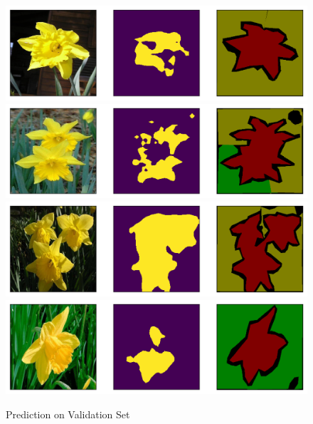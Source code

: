 \documentclass[12pt]{article}
\begin{document}
	\begin{figure}[H]
		\centering
		\caption{Prediction on Validation Set}
		\includegraphics[width=\linewidth]{figures/val0.png}
		\includegraphics[width=\linewidth]{figures/val1.png}
		\includegraphics[width=\linewidth]{figures/val2.png}
		\includegraphics[width=\linewidth]{figures/val3.png}
	\end{figure}
\end{document}
